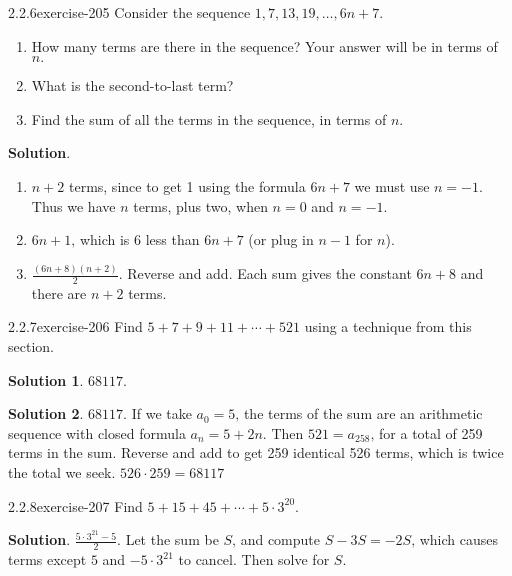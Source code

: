 \documentclass[twoside,11pt,]{book}
\numberwithin{equation}{chapter}
\begin{document}
\begin{divisionsolution}{2.2.6}{}{exercise-205}%
\hypertarget{p-3225}{}%
Consider the sequence \(1, 7, 13, 19, \ldots, 6n + 7\text{.}\)\leavevmode%
\begin{enumerate}[label=(\alph*)]
\item\hypertarget{li-1896}{}\hypertarget{p-3226}{}%
How many terms are there in the sequence? Your answer will be in terms of \(n\text{.}\)%
\item\hypertarget{li-1897}{}\hypertarget{p-3228}{}%
What is the second-to-last term?%
\item\hypertarget{li-1898}{}\hypertarget{p-3230}{}%
Find the sum of all the terms in the sequence, in terms of \(n\text{.}\)%
\end{enumerate}
%
\par\smallskip%
\noindent\textbf{Solution}.\quad%
\hypertarget{p-3232}{}%
\leavevmode%
\begin{enumerate}[label=(\alph*)]
\item\hypertarget{li-1899}{}\hypertarget{p-3233}{}%
\(n+2\) terms, since to get 1 using the formula \(6n+7\) we must use \(n=-1\text{.}\) Thus we have \(n\) terms, plus two, when \(n=0\) and \(n=-1\text{.}\)%
\item\hypertarget{li-1900}{}\hypertarget{p-3234}{}%
\(6n+1\text{,}\) which is 6 less than \(6n+7\) (or plug in \(n-1\) for \(n\)).%
\item\hypertarget{li-1901}{}\hypertarget{p-3235}{}%
\(\frac{(6n+8)(n+2)}{2}\text{.}\) Reverse and add. Each sum gives the constant \(6n+8\) and there are \(n+2\) terms.%
\end{enumerate}
%
\end{divisionsolution}%
\begin{divisionsolution}{2.2.7}{}{exercise-206}%
\hypertarget{p-3240}{}%
Find \(5 + 7 + 9 + 11+ \cdots + 521\) using a technique from this section.%
\par\smallskip%
\noindent\textbf{Solution 1}.\quad%
\hypertarget{p-3242}{}%
\(68117\text{.}\)%
\par\smallskip%
\noindent\textbf{Solution 2}.\quad%
\hypertarget{p-3243}{}%
\(68117\text{.}\) If we take \(a_0 = 5\text{,}\) the terms of the sum are an arithmetic sequence with closed formula \(a_n = 5+2n\text{.}\) Then \(521 = a_{258}\text{,}\) for a total of 259 terms in the sum. Reverse and add to get 259 identical 526 terms, which is twice the total we seek. \(526\cdot 259 = 68117\)%
\end{divisionsolution}%
\begin{divisionsolution}{2.2.8}{}{exercise-207}%
\hypertarget{p-3247}{}%
Find \(5 + 15 + 45 + \cdots + 5\cdot 3^{20}\text{.}\)%
\par\smallskip%
\noindent\textbf{Solution}.\quad%
\hypertarget{p-3249}{}%
\(\frac{5\cdot 3^{21}-5}{2}\text{.}\) Let the sum be \(S\text{,}\) and compute \(S - 3S = -2S\text{,}\) which causes terms except \(5\) and \(-5\cdot 3^{21}\) to cancel. Then solve for \(S\text{.}\)%
\end{divisionsolution}%
\end{document}
